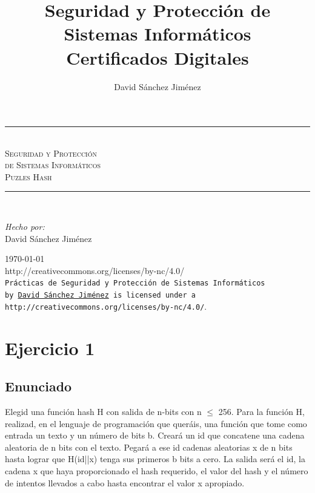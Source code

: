\documentclass[10pt,a4paper,spanish]{report}
\title{Seguridad y Protección de Sistemas Informáticos \\
Certificados Digitales}
\author{David Sánchez Jiménez}
\newcommand{\HRule}{\rule{\linewidth}{0.5mm}} %
\begin{document}
\begin{titlepage}
 \begin{center}
  \HRule \\[0.8cm]
  \textsc{\huge Seguridad y Protección \\ de Sistemas Informáticos \\[0.5cm] Puzles Hash}\\[1.6cm]
  \HRule \\[1cm]
  \begin{flushleft}
   \emph{Hecho por:}\\
   David Sánchez Jiménez
  \end{flushleft}
  \vspace{12cm}
  \large{\today}\\
  \vspace{0.5cm}
  {http://creativecommons.org/licenses/by-nc/4.0/}\\[0.5cm]
  \texttt{Prácticas de Seguridad y Protección de Sistemas Informáticos\\ by
   \href{mailto:dasaji92@gmail.com}{David Sánchez Jiménez} is licensed under a 
   {http://creativecommons.org/licenses/by-nc/4.0/}}.\\[3mm]
 \end{center}
\end{titlepage}

\tableofcontents
\newpage

\chapter{Ejercicio 1}

\section{Enunciado}
\noindent
Elegid una función hash H con salida de n-bits con n $\leq$ 256. Para la función H, realizad, en el lenguaje de programación que queráis, una función que tome como entrada un texto y un número de bits b. Creará un id que concatene una cadena aleatoria de n bits con el texto. Pegará a ese id cadenas aleatorias x de n bits hasta lograr que H(id||x) tenga sus primeros b bits a cero. La salida será el id, la cadena x que haya proporcionado el hash requerido, el valor del hash y el número de intentos llevados a cabo hasta encontrar el valor x apropiado.
\end{document}
